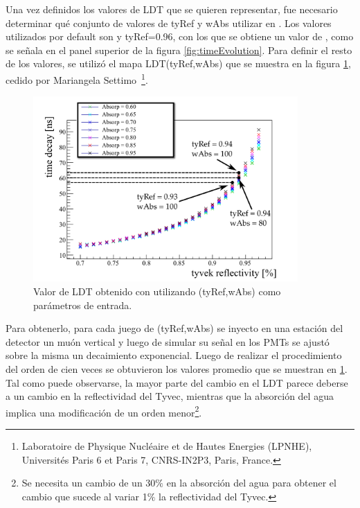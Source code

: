 	Una vez definidos los valores de LDT que se quieren representar, fue necesario determinar qué conjunto de valores de tyRef y wAbs utilizar en \Offline{}.
	Los valores utilizados por default son  y tyRef=0.96, con los que se obtiene un valor de , como se señala en el panel superior de la figura \ref{fig:timeEvolution}.
	Para definir el resto de los valores, se utilizó el mapa LDT(tyRef,wAbs) que se muestra en la figura \ref{fig:timedecay_vs_reflect_absorp}, cedido por Mariangela Settimo~\footnote{ Laboratoire de Physique Nucléaire et de Hautes Energies (LPNHE), Universités Paris 6 et Paris 7, CNRS-IN2P3, Paris, France.}.
	\begin{figure}[ht!]
		\begin{center}
			\includegraphics[width=0.9\textwidth]{fig/resultadosAuger/timedecay_vs_reflect_absorp_2}
			\caption{Valor de LDT obtenido con \Offline{} utilizando (tyRef,wAbs) como parámetros de entrada.}
			\label{fig:timedecay_vs_reflect_absorp}
		\end{center}
	\end{figure}
	Para obtenerlo, para cada juego de (tyRef,wAbs) se inyecto en una estación del detector un muón vertical y luego de simular su señal en los PMTs se ajustó sobre la misma un decaimiento exponencial. Luego de realizar el procedimiento del orden de cien veces se obtuvieron los valores promedio que se muestran en \ref{fig:timedecay_vs_reflect_absorp}.
	Tal como puede observarse, la mayor parte del cambio en el LDT parece deberse a un cambio en la reflectividad del Tyvec, mientras que la absorción del agua implica una modificaci\'on de un orden menor\footnote{Se necesita un cambio de un $30\%$ en la absorción del agua para obtener el cambio que sucede al variar 1$\%$ la reflectividad del Tyvec.}.
